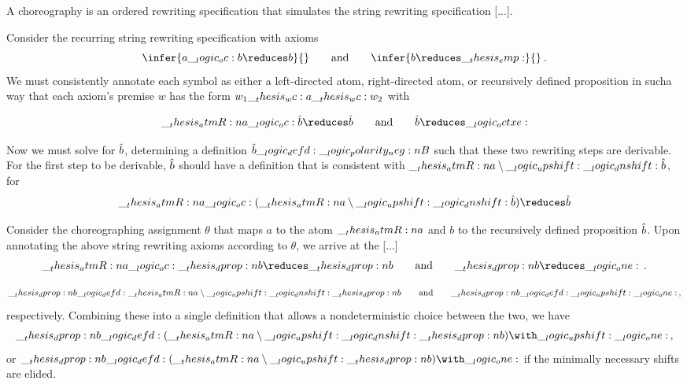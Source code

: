 A choreography is an ordered rewriting specification that simulates the string rewriting specification [...].

Consider the recurring string rewriting specification with axioms
\begin{equation*}
  \infer{a \oc b \reduces b}{}
  \qquad\text{and}\qquad
  \infer{b \reduces \emp}{}
  \:.
\end{equation*}
We must consistently annotate each symbol as either a left-directed atom, right-directed atom, or recursively defined proposition in sucha way that each axiom's premise $w$ has the form $w_1 \wc a \wc w_2$ with 

\begin{equation*}
  \atmR{a} \oc \defp{b} \reduces \defp{b}
  \qquad\text{and}\qquad
  \defp{b} \reduces \octxe
\end{equation*}

Now we must solve for $\hat{b}$, determining a definition $\hat{b} \__logic_defd: \__logic_polarity_neg:n {B}$ such that these two rewriting steps are derivable.
For the first step to be derivable, $\hat{b}$ should have a definition that is consistent with $\__thesis_atmR:n {a} \mathbin { \setminus } \__logic_upshift: \__logic_dnshift: \hat{b}$, for 
\begin{equation*}
  \atmR{a} \oc (\atmR{a} \limp \up \dn \defp{b}) \reduces \defp{b}
\end{equation*}

Consider the choreographing assignment $\theta$ that maps $a$ to the atom $\__thesis_atmR:n {a}$ and $b$ to the recursively defined proposition $\hat{b}$.
Upon annotating the above string rewriting axioms according to $\theta$, we arrive at the [...]
\begin{equation*}
  \atmR{a} \oc \dprop{b} \reduces \dprop{b}
  \qquad\text{and}\qquad
  \dprop{b} \reduces \one
  \,.
\end{equation*}

\begin{equation*}
  \__thesis_dprop:n {b} \__logic_defd: \__thesis_atmR:n {a} \mathbin { \setminus } \__logic_upshift: \__logic_dnshift: \__thesis_dprop:n {b}
  \qquad\text{and}\qquad
  \__thesis_dprop:n {b} \__logic_defd: \__logic_upshift: \__logic_one:
  \,,
\end{equation*}
respectively.
Combining these into a single definition that allows a nondeterministic choice between the two, we have
\begin{equation*}
  \dprop{b} \defd (\atmR{a} \limp \up \dn \dprop{b}) \with \up \one
  \,,
\end{equation*}
or $\dprop{b} \defd (\atmR{a} \limp \up \dprop{b}) \with \one$ if the minimally necessary shifts are elided.

